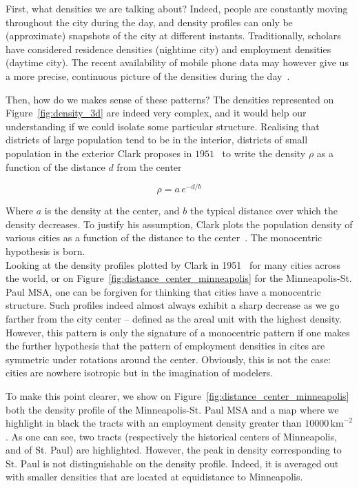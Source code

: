 First, what densities we are talking about? Indeed, people are constantly moving
throughout the city during the day, and density profiles can only be
(approximate) snapshots of the city at different instants. Traditionally,
scholars have considered residence densities (nightime city) and employment
densities (daytime city). The recent availability of mobile phone data 
may however give us a more precise, continuous picture of the
densities during the day~\cite{Louail:2014}.


Then, how do we makes sense of these patterns? The densities
represented on Figure~\ref{fig:density_3d} are indeed very complex, and it would
help our understanding if we could isolate some particular structure.
Realising that districts of large population tend to be in the interior,
districts of small population in the exterior Clark proposes in
$1951$~\cite{Clark:1951} to write the density $\rho$ as a function of the
distance $d$ from the center

\begin{equation}
    \rho = a\,e^{-d/b} 
\end{equation}

Where $a$ is the density at the center, and $b$ the typical distance over which
the density decreases. To justify his assumption, Clark plots the population
density of various cities as a function of the distance to the
center~\cite{Clark:1951}. The monocentric hypothesis is born.\\

Looking at the density profiles plotted by Clark in 1951~\cite{Clark:1951} for
many cities across the world, or on Figure~\ref{fig:distance_center_minneapolis}
for the Minneapolis-St. Paul MSA, one can be
forgiven for thinking that cities have a monocentric structure. Such profiles
indeed almost always exhibit a sharp decrease as we go farther from the city
center -- defined as the areal unit with the highest density. However, this
pattern is only the signature of a monocentric pattern if one makes the further
hypothesis that the pattern of employment densities in cites are symmetric
under rotations around the center. Obviously, this is not the case: cities are
nowhere isotropic but in the imagination of modelers. 

To make this point clearer, we show on
Figure~\ref{fig:distance_center_minneapolis} both the density profile of the
Minneapolis-St. Paul MSA and a map where we highlight in black the tracts with
an employment density greater than $10000\,\text{km}^{-2}$. As one can see, two
tracts (respectively the historical centers of Minneapolis, and of St. Paul) are
highlighted. However, the peak in density corresponding to St. Paul is not
distinguishable on the density profile. Indeed, it is averaged out with smaller
densities that are located at equidistance to Minneapolis.

